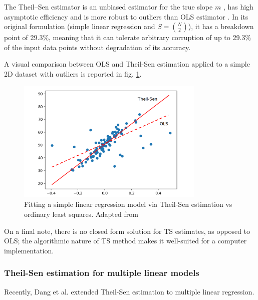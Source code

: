 The Theil–Sen estimator is an unbiased estimator for the true slope $m$ \cite{sen, unbiasedness_theil-sen}, has high asymptotic efficiency \cite{sen, efficiency_theil-sen} and is more robust to outliers than OLS estimator \cite{multi_theil-sen}. In its original formulation (simple linear regression and $S=\binom{N}{2}$), it has a breakdown point of 29.3\%, meaning that it can tolerate arbitrary corruption of up to 29.3\% of the input data points without degradation of its accuracy.

A visual comparison between OLS and Theil-Sen estimation applied to a simple 2D dataset with outliers is reported in fig. \ref{fig:theil-sen_vs_ols}.
\begin{figure}[hbt!]
    \centering
    \includegraphics[width=0.8\textwidth]{images/theil-sen_vs_ols}
    \caption[Fitting a simple linear model via TS]{Fitting a simple linear regression model via Theil-Sen estimation vs ordinary least squares. Adapted from \cite{theil-sen_vs_ols}}
    \label{fig:theil-sen_vs_ols}
\end{figure}

On a final note, there is no closed form solution for TS estimates, as opposed to OLS; the algorithmic nature of TS method makes it well-suited for a computer implementation.

\subsubsection{Theil-Sen estimation for multiple linear models}
Recently, Dang et al. \cite{multi_theil-sen} extended Theil-Sen estimation to multiple linear regression.

